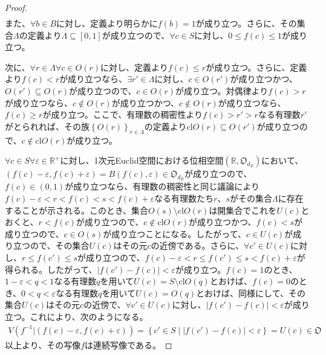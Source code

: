 \documentclass[dvipdfmx]{jsarticle}
\begin{document}
\begin{proof}
\begin{align*}
\end{align*}
また、$\forall b \in B$に対し、定義より明らかに$f(b) = 1$が成り立つ。さらに、その集合$\varLambda$の定義より$\varLambda \subseteq [ 0,1]$が成り立つので、$\forall c \in S$に対し、$0 \leq f(c) \leq 1$が成り立つ。\par
次に、$\forall r \in \varLambda\forall c \in O(r)$に対し、定義より$f(c) \leq r$が成り立つ。さらに、定義より$f(c) < r$が成り立つなら、$\exists r' \in \varLambda$に対し、$c \in O\left( r' \right)$が成り立つかつ、$O\left( r' \right) \subseteq O(r)$が成り立つので、$c \in O(r)$が成り立つ。対偶律より$f(c) > r$が成り立つなら、$c \notin O(r)$が成り立つかつ、$c \notin O(r)$が成り立つなら、$f(c) \geq r$が成り立つ。ここで、有理数の稠密性より$f(c) > r' > r$なる有理数$r'$がとられれば、その族$\left\{ O(r) \right\}_{r \in \mathbf{\varLambda}}$の定義より${\mathrm{cl}}{O(r)} \subseteq O\left( r' \right)$が成り立つので、$c \notin {\mathrm{cl}}{O(r)}$が成り立つ。\par
$\forall c \in S\forall\varepsilon \in \mathbb{R}^{+}$に対し、1次元Euclid空間における位相空間$\left( \mathbb{R},\mathfrak{O}_{d_{E}} \right)$において、$\left( f(c) - \varepsilon,f(c) + \varepsilon \right) = B\left( f(c),\varepsilon \right) \in \mathfrak{O}_{d_{E}}$が成り立つので、$f(c) \in (0,1)$が成り立つなら、有理数の稠密性と同じ議論により$f(c) - \varepsilon < r < f(c) < s < f(c) + \varepsilon$なる有理数たち$r$、$s$がその集合$\varLambda$に存在することが示される。このとき、集合$O(s) \setminus {\mathrm{cl}}{O(r)}$は開集合でこれを$U(c)$とおくと、$r < f(c)$が成り立つので、$c \notin {\mathrm{cl}}{O(r)}$が成り立つかつ、$f(c) < s$が成り立つので、$c \in O(s)$が成り立つことになる。したがって、$c \in U(c)$が成り立つので、その集合$U(c)$はその元$c$の近傍である。さらに、$\forall c' \in U(c)$に対し、$r \leq f\left( c' \right) \leq s$が成り立つので、$f(c) - \varepsilon < r \leq f\left( c' \right) \leq s < f(c) + \varepsilon$が得られる。したがって、$\left| f\left( c' \right) - f(c) \right| < \varepsilon$が成り立つ。$f(c) = 1$のとき、$1 - \varepsilon < q < 1$なる有理数$q$を用いて$U(c) = S \setminus {\mathrm{cl}}{O(q)}$とおけば、$f(c) = 0$のとき、$0 < q < \varepsilon$なる有理数$q$を用いて$U(c) = O(q)$とおけば、同様にして、その集合$U(c)$はその元$c$の近傍で、$\forall c' \in U(c)$に対し、$\left| f\left( c' \right) - f(c) \right| < \varepsilon$が成り立つ。これにより、次のようになる。
\begin{align*}
V\left( f^{- 1}|\left( f(c) - \varepsilon,f(c) + \varepsilon \right) \right) = \left\{ c' \in S \middle| \left| f\left( c' \right) - f(c) \right| < \varepsilon \right\} = U(c)\in \mathfrak{O}
\end{align*}
以上より、その写像$f$は連続写像である。
\end{proof}
\end{document}
